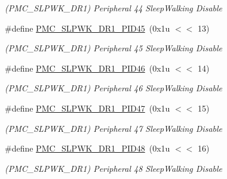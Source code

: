 \begin{DoxyCompactItemize}
\begin{DoxyCompactList}\small\item\em (P\+M\+C\+\_\+\+S\+L\+P\+W\+K\+\_\+\+D\+R1) Peripheral 44 Sleep\+Walking Disable \end{DoxyCompactList}\item 
\mbox{\label{group__SAMS70__PMC_gad070a6e877cf1a5db6f28d65a5aeb067}} 
\#define \mbox{\hyperlink{group__SAMS70__PMC_gad070a6e877cf1a5db6f28d65a5aeb067}{P\+M\+C\+\_\+\+S\+L\+P\+W\+K\+\_\+\+D\+R1\+\_\+\+P\+I\+D45}}~(0x1u $<$$<$ 13)
\begin{DoxyCompactList}\small\item\em (P\+M\+C\+\_\+\+S\+L\+P\+W\+K\+\_\+\+D\+R1) Peripheral 45 Sleep\+Walking Disable \end{DoxyCompactList}\item 
\mbox{\label{group__SAMS70__PMC_ga7e9a3273aacfe6cce7bd9c1b7839e00d}} 
\#define \mbox{\hyperlink{group__SAMS70__PMC_ga7e9a3273aacfe6cce7bd9c1b7839e00d}{P\+M\+C\+\_\+\+S\+L\+P\+W\+K\+\_\+\+D\+R1\+\_\+\+P\+I\+D46}}~(0x1u $<$$<$ 14)
\begin{DoxyCompactList}\small\item\em (P\+M\+C\+\_\+\+S\+L\+P\+W\+K\+\_\+\+D\+R1) Peripheral 46 Sleep\+Walking Disable \end{DoxyCompactList}\item 
\mbox{\label{group__SAMS70__PMC_gae32fd6bbbae61bc66c0e49f82fb51440}} 
\#define \mbox{\hyperlink{group__SAMS70__PMC_gae32fd6bbbae61bc66c0e49f82fb51440}{P\+M\+C\+\_\+\+S\+L\+P\+W\+K\+\_\+\+D\+R1\+\_\+\+P\+I\+D47}}~(0x1u $<$$<$ 15)
\begin{DoxyCompactList}\small\item\em (P\+M\+C\+\_\+\+S\+L\+P\+W\+K\+\_\+\+D\+R1) Peripheral 47 Sleep\+Walking Disable \end{DoxyCompactList}\item 
\mbox{\label{group__SAMS70__PMC_ga71fcb7b9c9f1d45cbf20671232affec3}} 
\#define \mbox{\hyperlink{group__SAMS70__PMC_ga71fcb7b9c9f1d45cbf20671232affec3}{P\+M\+C\+\_\+\+S\+L\+P\+W\+K\+\_\+\+D\+R1\+\_\+\+P\+I\+D48}}~(0x1u $<$$<$ 16)
\begin{DoxyCompactList}\small\item\em (P\+M\+C\+\_\+\+S\+L\+P\+W\+K\+\_\+\+D\+R1) Peripheral 48 Sleep\+Walking Disable \end{DoxyCompactList}\item 

\end{DoxyCompactItemize}
